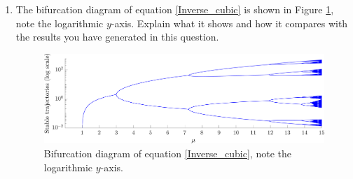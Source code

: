 \documentclass[10pt]{article}
\newcommand{\fig}[1]{Figure \ref{#1}}
\newcommand{\eqn}[1]{equation \eqref{#1}}
\begin{document}
\begin{enumerate}
\begin{enumerate}
\item The bifurcation diagram of \eqn{Inverse_cubic} is shown in \fig{Discrete_inverse_cubic}, note the logarithmic $y$-axis. Explain what it shows and how it compares with the results you have generated in this question.
\begin{figure}[h!!!tb]
\centering
\includegraphics[width=\textwidth]{../../Pictures/Discrete_inverse_cubic.png}
\caption{\label{Discrete_inverse_cubic} Bifurcation diagram of \eqn{Inverse_cubic}, note the logarithmic $y$-axis.}
\end{figure}
\end{enumerate}

\end{enumerate}
\end{document}
